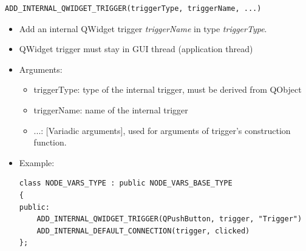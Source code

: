 \documentclass[a4paper,10pt]{book}
\begin{document}
\begin{mdframed}
\begin{verbatim}
ADD_INTERNAL_QWIDGET_TRIGGER(triggerType, triggerName, ...)
\end{verbatim}
\begin{itemize}
 \item Add an internal QWidget trigger {\em{triggerName}} in type {\em{triggerType}}.
 \item QWidget trigger must stay in GUI thread (application thread)
 \item Arguments:
 \begin{itemize}
  \item triggerType: type of the internal trigger, must be derived from QObject
  \item triggerName: name of the internal trigger
  \item ...: [Variadic arguments], used for arguments of trigger's construction function. 
 \end{itemize}
 \item Example:
 \begin{verbatim}
class NODE_VARS_TYPE : public NODE_VARS_BASE_TYPE
{
public:
    ADD_INTERNAL_QWIDGET_TRIGGER(QPushButton, trigger, "Trigger")
    ADD_INTERNAL_DEFAULT_CONNECTION(trigger, clicked)
};
 \end{verbatim}
\end{itemize}
\end{mdframed}
\end{document}
